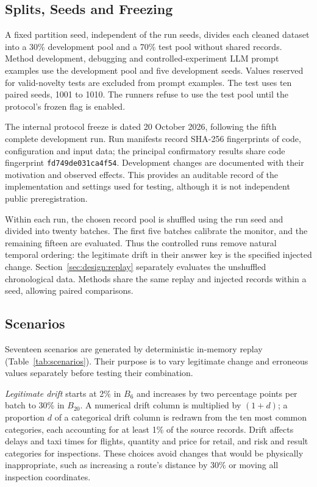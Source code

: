 \subsection{Splits, Seeds and Freezing}
\label{sec:design:splits}

A fixed partition seed, independent of the run seeds, divides each cleaned dataset into a 30\% development pool and a 70\% test pool without shared records. Method development, debugging and controlled-experiment LLM prompt examples use the development pool and five development seeds. Values reserved for valid-novelty tests are excluded from prompt examples. The test uses ten paired seeds, 1001 to 1010. The runners refuse to use the test pool until the protocol's frozen flag is enabled.

The internal protocol freeze is dated 20 October 2026, following the fifth complete development run. Run manifests record SHA-256 fingerprints of code, configuration and input data; the principal confirmatory results share code fingerprint \texttt{fd749de031ca4f54}. Development changes are documented with their motivation and observed effects. This provides an auditable record of the implementation and settings used for testing, although it is not independent public preregistration.

Within each run, the chosen record pool is shuffled using the run seed and divided into twenty batches. The first five batches calibrate the monitor, and the remaining fifteen are evaluated. Thus the controlled runs remove natural temporal ordering: the legitimate drift in their answer key is the specified injected change. Section~\ref{sec:design:replay} separately evaluates the unshuffled chronological data. Methods share the same replay and injected records within a seed, allowing paired comparisons.

\subsection{Scenarios}
\label{sec:design:scenarios}

Seventeen scenarios are generated by deterministic in-memory replay (Table~\ref{tab:scenarios}). Their purpose is to vary legitimate change and erroneous values separately before testing their combination.

\emph{Legitimate drift} starts at 2\% in $B_6$ and increases by two percentage points per batch to 30\% in $B_{20}$. A numerical drift column is multiplied by $(1+d)$; a proportion $d$ of a categorical drift column is redrawn from the ten most common categories, each accounting for at least 1\% of the source records. Drift affects delays and taxi times for flights, quantity and price for retail, and risk and result categories for inspections. These choices avoid changes that would be physically inappropriate, such as increasing a route's distance by 30\% or moving all inspection coordinates.

